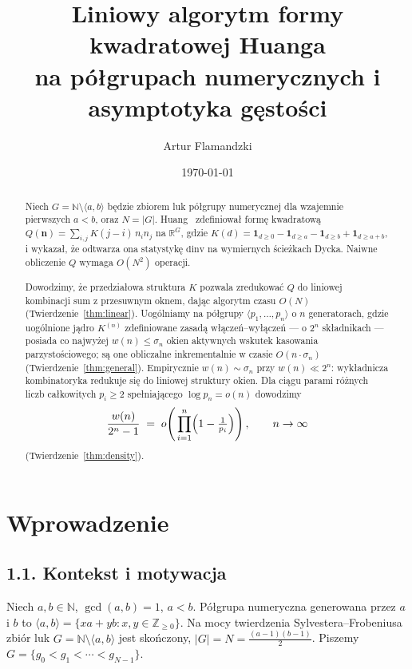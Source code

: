 \documentclass[11pt,a4paper]{amsart}
\title{Liniowy algorytm formy kwadratowej Huanga\\
na półgrupach numerycznych i asymptotyka gęstości}
\author{Artur Flamandzki}
\date{\today}
\theoremstyle{plain}
\theoremstyle{definition}
\theoremstyle{remark}
\begin{document}
\begin{abstract}
Niech $G = \mathbb{N} \setminus \langle a, b \rangle$ będzie zbiorem luk
półgrupy numerycznej dla wzajemnie pierwszych $a < b$, oraz $N = |G|$.
Huang~\cite{Huang2026} zdefiniował formę kwadratową
$Q(\mathbf{n}) = \sum_{i,j} K(j-i)\,n_i n_j$ na $\mathbb{R}^G$, gdzie
$K(d) = \mathbf{1}_{d \geq 0} - \mathbf{1}_{d \geq a} - \mathbf{1}_{d \geq b}
+ \mathbf{1}_{d \geq a+b}$, i wykazał, że odtwarza ona statystykę
$\mathrm{dinv}$ na wymiernych ścieżkach Dycka.
Naiwne obliczenie $Q$ wymaga $O(N^2)$ operacji.

Dowodzimy, że przedziałowa struktura $K$ pozwala zredukować $Q$ do
liniowej kombinacji sum z przesuwnym oknem, dając algorytm czasu $O(N)$
(Twierdzenie~\ref{thm:linear}). Uogólniamy na półgrupy
$\langle p_1,\ldots,p_n \rangle$ o $n$ generatorach, gdzie uogólnione
jądro $K^{(n)}$ zdefiniowane zasadą włączeń--wyłączeń
--- o $2^n$ składnikach --- posiada co najwyżej $w(n) \leq \sigma_n$
okien aktywnych wskutek kasowania parzystościowego;
są one obliczalne inkrementalnie w czasie $O(n \cdot \sigma_n)$
(Twierdzenie~\ref{thm:general}).
Empirycznie $w(n) \sim \sigma_n$ przy $w(n) \ll 2^n$:
wykładnicza kombinatoryka redukuje się do liniowej struktury okien.
Dla ciągu parami różnych liczb całkowitych $p_i \geq 2$ spełniającego
$\log p_n = o(n)$ dowodzimy
\[
  \frac{w(n)}{2^n - 1} \;=\; o\!\left(\,\prod_{i=1}^{n}
    \Bigl(1 - \tfrac{1}{p_i}\Bigr)\right), \qquad n \to \infty
\]
(Twierdzenie~\ref{thm:density}).
\end{abstract}

\maketitle

\section{Wprowadzenie}
\label{sec:intro}

\subsection*{1.1. Kontekst i motywacja}

Niech $a, b \in \mathbb{N}$, $\gcd(a,b) = 1$, $a < b$.
Półgrupa numeryczna generowana przez $a$ i $b$ to
$\langle a, b \rangle = \{ xa + yb : x, y \in \mathbb{Z}_{\geq 0} \}$.
Na mocy twierdzenia Sylvestera--Frobeniusa zbiór luk
$G = \mathbb{N} \setminus \langle a, b \rangle$ jest skończony,
$|G| = N = \tfrac{(a-1)(b-1)}{2}$.
Piszemy $G = \{g_0 < g_1 < \cdots < g_{N-1}\}$.
\end{document}
